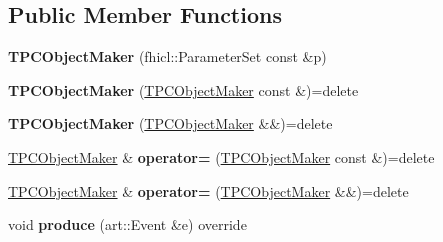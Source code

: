 \subsection*{Public Member Functions}
\begin{DoxyCompactItemize}
\item 
\hypertarget{group__UBXSec_gae030804e6aa4085bef6be52e9618fee9}{{\bfseries T\-P\-C\-Object\-Maker} (fhicl\-::\-Parameter\-Set const \&p)}\label{group__UBXSec_gae030804e6aa4085bef6be52e9618fee9}

\item 
\hypertarget{classubana_1_1TPCObjectMaker_a4b31917ac5f8837607be0ee7a6f11228}{{\bfseries T\-P\-C\-Object\-Maker} (\hyperlink{classubana_1_1TPCObjectMaker}{T\-P\-C\-Object\-Maker} const \&)=delete}\label{classubana_1_1TPCObjectMaker_a4b31917ac5f8837607be0ee7a6f11228}

\item 
\hypertarget{classubana_1_1TPCObjectMaker_ad7657af20d88fabb8df0731ee266d844}{{\bfseries T\-P\-C\-Object\-Maker} (\hyperlink{classubana_1_1TPCObjectMaker}{T\-P\-C\-Object\-Maker} \&\&)=delete}\label{classubana_1_1TPCObjectMaker_ad7657af20d88fabb8df0731ee266d844}

\item 
\hypertarget{classubana_1_1TPCObjectMaker_a033d89d1b56c526c5583b9c13c61b7bb}{\hyperlink{classubana_1_1TPCObjectMaker}{T\-P\-C\-Object\-Maker} \& {\bfseries operator=} (\hyperlink{classubana_1_1TPCObjectMaker}{T\-P\-C\-Object\-Maker} const \&)=delete}\label{classubana_1_1TPCObjectMaker_a033d89d1b56c526c5583b9c13c61b7bb}

\item 
\hypertarget{classubana_1_1TPCObjectMaker_a5d3a8bd521e699c7b381e8336a927ffd}{\hyperlink{classubana_1_1TPCObjectMaker}{T\-P\-C\-Object\-Maker} \& {\bfseries operator=} (\hyperlink{classubana_1_1TPCObjectMaker}{T\-P\-C\-Object\-Maker} \&\&)=delete}\label{classubana_1_1TPCObjectMaker_a5d3a8bd521e699c7b381e8336a927ffd}

\item 
\hypertarget{group__UBXSec_ga07c03a811bbaccdbeb20b2b7714034c9}{void {\bfseries produce} (art\-::\-Event \&e) override}\label{group__UBXSec_ga07c03a811bbaccdbeb20b2b7714034c9}


\end{DoxyCompactItemize}
